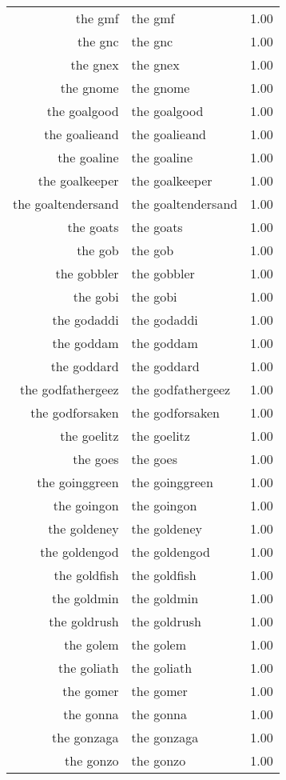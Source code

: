 \begin{table}[ht]
\begin{tabular}{rlr}
  the gmf & the gmf & 1.00 \\ 
  the gnc & the gnc & 1.00 \\ 
  the gnex & the gnex & 1.00 \\ 
  the gnome & the gnome & 1.00 \\ 
  the goalgood & the goalgood & 1.00 \\ 
  the goalieand & the goalieand & 1.00 \\ 
  the goaline & the goaline & 1.00 \\ 
  the goalkeeper & the goalkeeper & 1.00 \\ 
  the goaltendersand & the goaltendersand & 1.00 \\ 
  the goats & the goats & 1.00 \\ 
  the gob & the gob & 1.00 \\ 
  the gobbler & the gobbler & 1.00 \\ 
  the gobi & the gobi & 1.00 \\ 
  the godaddi & the godaddi & 1.00 \\ 
  the goddam & the goddam & 1.00 \\ 
  the goddard & the goddard & 1.00 \\ 
  the godfathergeez & the godfathergeez & 1.00 \\ 
  the godforsaken & the godforsaken & 1.00 \\ 
  the goelitz & the goelitz & 1.00 \\ 
  the goes & the goes & 1.00 \\ 
  the goinggreen & the goinggreen & 1.00 \\ 
  the goingon & the goingon & 1.00 \\ 
  the goldeney & the goldeney & 1.00 \\ 
  the goldengod & the goldengod & 1.00 \\ 
  the goldfish & the goldfish & 1.00 \\ 
  the goldmin & the goldmin & 1.00 \\ 
  the goldrush & the goldrush & 1.00 \\ 
  the golem & the golem & 1.00 \\ 
  the goliath & the goliath & 1.00 \\ 
  the gomer & the gomer & 1.00 \\ 
  the gonna & the gonna & 1.00 \\ 
  the gonzaga & the gonzaga & 1.00 \\ 
  the gonzo & the gonzo & 1.00 \\ 

\end{tabular}
\end{table}
